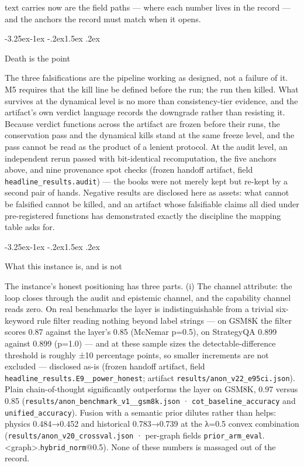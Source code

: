 \documentclass[11pt,a4paper]{article}
\makeatletter
\renewcommand\subsection{\@startsection{subsection}{2}{\z@}%
  {-3.25ex\@plus -1ex \@minus -.2ex}{1.5ex \@plus .2ex}%
  {\normalfont\large\bfseries\raggedright}}
\makeatother
\begin{document}
text carries now are the field paths — where each number lives in the record — and the anchors the record must match when it opens.

\subsection{Death is the point}

The three falsifications are the pipeline working as designed, not a failure of it. M5 requires that the kill line be defined before the run; the run then killed. What survives at the dynamical level is no more than consistency-tier evidence, and the artifact's own verdict language records the downgrade rather than resisting it. Because verdict functions across the artifact are frozen before their runs, the conservation pass and the dynamical kills stand at the same freeze level, and the pass cannot be read as the product of a lenient protocol. At the audit level, an independent rerun passed with bit-identical recomputation, the five anchors above, and nine provenance spot checks (frozen handoff artifact, field \texttt{headline\_\allowbreak results.audit}) — the books were not merely kept but re-kept by a second pair of hands. Negative results are disclosed here as assets: what cannot be falsified cannot be killed, and an artifact whose falsifiable claims all died under pre-registered functions has demonstrated exactly the discipline the mapping table asks for.

\subsection{What this instance is, and is not}

The instance's honest positioning has three parts. (i) The channel attribute: the loop closes through the audit and epistemic channel, and the capability channel reads zero. On real benchmarks the layer is indistinguishable from a trivial six-keyword rule filter reading nothing beyond label strings — on GSM8K the filter scores 0.87 against the layer's 0.85 (McNemar p=0.5), on StrategyQA 0.899 against 0.899 (p=1.0) — and at these sample sizes the detectable-difference threshold is roughly ±10 percentage points, so smaller increments are not excluded — disclosed as-is (frozen handoff artifact, field \texttt{headline\_\allowbreak results.E9\_\_\allowbreak power\_\allowbreak honest}; artifact \texttt{results/\allowbreak anon\_\allowbreak v22\_\allowbreak e95ci.json}). Plain chain-of-thought significantly outperforms the layer on GSM8K, 0.97 versus 0.85 (\texttt{results/\allowbreak anon\_\allowbreak benchmark\_\allowbreak v1\_\_\allowbreak gsm8k.json} · \texttt{cot\_\allowbreak baseline\_\allowbreak accuracy} and \texttt{unified\_\allowbreak accuracy}). Fusion with a semantic prior dilutes rather than helps: physics 0.484→0.452 and historical 0.783→0.739 at the λ=0.5 convex combination (\texttt{results/\allowbreak anon\_\allowbreak v20\_\allowbreak crossval.json} · per-graph fields \texttt{prior\_\allowbreak arm\_\allowbreak eval}.<graph>.\texttt{hybrid\_\allowbreak norm}@0.5). None of these numbers is massaged out of the record.
\end{document}

